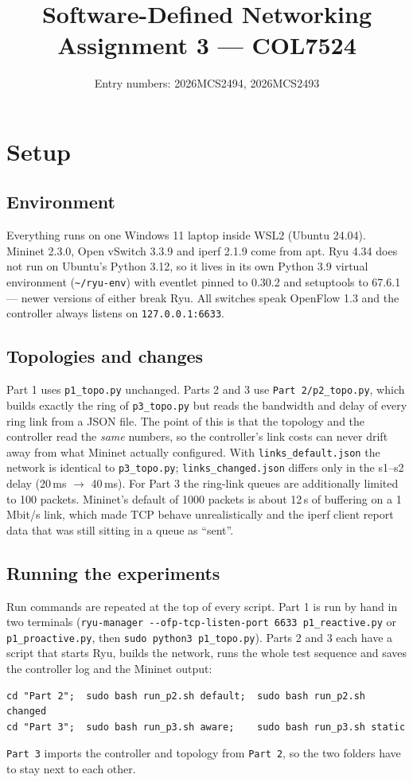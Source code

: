 \documentclass[11pt]{article}
\title{Software-Defined Networking\\[2pt]\large Assignment 3 --- COL7524}
\author{Entry numbers: 2026MCS2494, 2026MCS2493}
\date{}
\begin{document}
\maketitle

\section{Setup}

\subsection{Environment}
Everything runs on one Windows 11 laptop inside WSL2 (Ubuntu 24.04). Mininet 2.3.0, Open vSwitch
3.3.9 and iperf 2.1.9 come from apt. Ryu 4.34 does not run on Ubuntu's Python 3.12, so it lives in
its own Python 3.9 virtual environment (\texttt{\textasciitilde/ryu-env}) with eventlet pinned to
0.30.2 and setuptools to 67.6.1 --- newer versions of either break Ryu. All switches speak
OpenFlow 1.3 and the controller always listens on \texttt{127.0.0.1:6633}.

\subsection{Topologies and changes}
Part 1 uses \texttt{p1\_topo.py} unchanged. Parts 2 and 3 use \texttt{Part 2/p2\_topo.py}, which builds
exactly the ring of \texttt{p3\_topo.py} but reads the bandwidth and delay of every ring link from a
JSON file. The point of this is that the topology and the controller read the \emph{same} numbers,
so the controller's link costs can never drift away from what Mininet actually configured. With
\texttt{links\_default.json} the network is identical to \texttt{p3\_topo.py};
\texttt{links\_changed.json} differs only in the s1--s2 delay (20\,ms $\to$ 40\,ms). For Part 3 the
ring-link queues are additionally limited to 100 packets. Mininet's default of 1000 packets is about
12\,s of buffering on a 1\,Mbit/s link, which made TCP behave unrealistically and the iperf client
report data that was still sitting in a queue as ``sent''.

\subsection{Running the experiments}
Run commands are repeated at the top of every script. Part 1 is run by hand in two terminals
(\texttt{ryu-manager -{}-ofp-tcp-listen-port 6633 p1\_reactive.py} or \texttt{p1\_proactive.py}, then
\texttt{sudo python3 p1\_topo.py}). Parts 2 and 3 each have a script that starts Ryu, builds the
network, runs the whole test sequence and saves the controller log and the Mininet output:
\begin{Verbatim}
cd "Part 2";  sudo bash run_p2.sh default;  sudo bash run_p2.sh changed
cd "Part 3";  sudo bash run_p3.sh aware;    sudo bash run_p3.sh static
\end{Verbatim}
\texttt{Part 3} imports the controller and topology from \texttt{Part 2}, so the two folders have to
stay next to each other.
\end{document}
